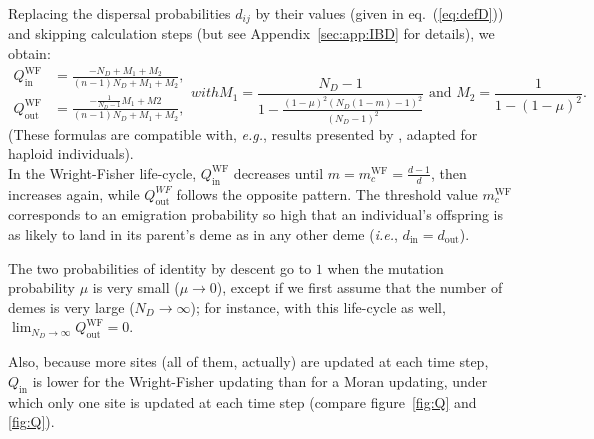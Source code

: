 \documentclass[11pt, letterpaper]{article}
\renewcommand{\eqref}[1]{\textup{{\normalfont eq.~(\ref{#1}}\normalfont)}}
\newcommand{\ie}{\textit{i.e.}}
\newcommand{\eg}{\textit{e.g.}}
\newcommand{\appname}[0]{Appendix}
\newcommand{\WF}{\textrm{WF}}
\newcommand{\inn}{\textrm{in}}
\newcommand{\out}{\textrm{out}}
\newcommand{\din}{d_{\inn}}
\newcommand{\dout}{d_{\out}}
\newcommand{\Qin}{Q_{\inn}}
\newcommand{\Qout}{Q_{\out}}
\newcommand{\ndemes}{N_D}
\begin{document}
Replacing the dispersal probabilities $d_{ij}$ by their values (given in \eqref{eq:defD}) and skipping calculation steps (but see \appname~\ref{sec:app:IBD} for details), we obtain:
%
\begin{subequations}\label{eq:QWF}
\begin{align}
\Qin^{\WF} &= \frac{-\ndemes + M_1 + M_2}{(n-1) \ndemes +M_1 + M_2}, \\
\Qout^{\WF} & = \frac{-\frac{1}{\ndemes-1}M_1 + M2}{(n-1) \ndemes +M_1 + M_2},
\end{align}
with
\begin{equation*}
M_1 = \frac{\ndemes-1}{1-\frac{(1-\mu )^2 (\ndemes (1-m)-1)^2}{(\ndemes-1)^2}} \textrm{ and }M_2 = \frac{1}{1-(1-\mu)^2}.
\end{equation*}
\end{subequations}
%
(These formulas are compatible with, \eg, results presented by \citet{CockerhamWeir1987}, adapted for haploid individuals).\\
In the Wright-Fisher life-cycle, $\Qin^{\WF}$ decreases until $m=m_c^{\WF} = \frac{d-1}{d}$, then increases again, while $\Qout^{WF}$ follows the opposite pattern. The threshold value $m_c^{\WF}$ corresponds to an emigration probability so high that an individual's offspring is as likely to land in its parent's deme as in any other deme (\ie, $\din = \dout$).

The two probabilities of identity by descent go to $1$ when the mutation probability $\mu$ is very small ($\mu \to 0$), except if we first assume that the number of demes is very large ($\ndemes \to \infty$); for instance, with this life-cycle as well, $\lim_{\ndemes \to \infty} \Qout^{\WF} = 0$. 

Also, because more sites (all of them, actually) are updated at each time step, $\Qin$ is lower for the Wright-Fisher updating than for a Moran updating, under which only one site is updated at each time step (compare figure~\ref{fig:Q} and \ref{fig:Q}). 
\end{document}
